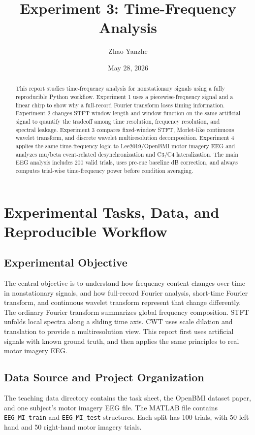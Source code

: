 \documentclass[a4paper,11pt]{article}
\title{Experiment 3: Time-Frequency Analysis}
\author{Zhao Yanzhe}
\date{May 28, 2026}
\numberwithin{equation}{section}
\begin{document}
\maketitle

\begin{abstract}
This report studies time-frequency analysis for nonstationary signals using a fully reproducible Python workflow. Experiment 1 uses a piecewise-frequency signal and a linear chirp to show why a full-record Fourier transform loses timing information. Experiment 2 changes STFT window length and window function on the same artificial signal to quantify the tradeoff among time resolution, frequency resolution, and spectral leakage. Experiment 3 compares fixed-window STFT, Morlet-like continuous wavelet transform, and discrete wavelet multiresolution decomposition. Experiment 4 applies the same time-frequency logic to Lee2019/OpenBMI motor imagery EEG and analyzes mu/beta event-related desynchronization and C3/C4 lateralization. The main EEG analysis includes 200 valid trials, uses pre-cue baseline dB correction, and always computes trial-wise time-frequency power before condition averaging.
\end{abstract}

\tableofcontents
\clearpage

\section{Experimental Tasks, Data, and Reproducible Workflow}
\subsection{Experimental Objective}
The central objective is to understand how frequency content changes over time in nonstationary signals, and how full-record Fourier analysis, short-time Fourier transform, and continuous wavelet transform represent that change differently. The ordinary Fourier transform summarizes global frequency composition. STFT unfolds local spectra along a sliding time axis. CWT uses scale dilation and translation to provide a multiresolution view. This report first uses artificial signals with known ground truth, and then applies the same principles to real motor imagery EEG.

\subsection{Data Source and Project Organization}
The teaching data directory contains the task sheet, the OpenBMI dataset paper, and one subject's motor imagery EEG file. The MATLAB file contains \texttt{EEG\_MI\_train} and \texttt{EEG\_MI\_test} structures. Each split has 100 trials, with 50 left-hand and 50 right-hand motor imagery trials.
\end{document}
